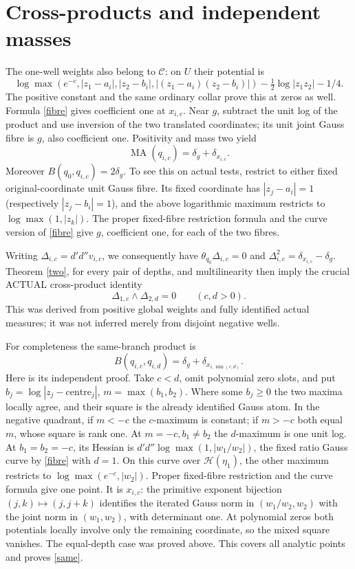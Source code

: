 \documentclass[11pt]{article}
\newcommand{\DD}{d'd''}
\newcommand{\MA}{\operatorname{MA}}
\newcommand{\C}{\mathcal C}
\begin{document}
\section*{Cross-products and independent masses}
The one-well weights also belong to $\C$: on $U$ their potential is
\[
 \log\max(e^{-c},|z_1-a_i|,|z_2-b_i|,
                 |(z_1-a_i)(z_2-b_i)|)
 -\tfrac12\log|z_1z_2|-1/4.
\]
The positive constant and the same ordinary collar prove this at zeros
as well. Formula \eqref{fibre} gives coefficient one at $x_{i,c}$.
Near $g$, subtract the unit log of the product and use inversion of
the two translated coordinates; its unit joint Gauss fibre is $g$,
also coefficient one. Positivity and mass two yield
\[
 \MA(q_{i,c})=\delta_g+\delta_{x_{i,c}}.
\]
Moreover $B(q_0,q_{i,c})=2\delta_g$. To see this on actual tests, restrict
to either fixed original-coordinate unit Gauss fibre. Its fixed coordinate
has $|z_j-a_i|=1$ (respectively $|z_j-b_i|=1$), and the above logarithmic
maximum restricts to $\log\max(1,|z_k|)$. The proper fixed-fibre
restriction formula and the curve version of \eqref{fibre} give $g$,
coefficient one, for each of the two fibres.

Writing $\Delta_{i,c}=\DD v_{i,c}$, we consequently have
$\theta_{q_0}\Delta_{i,c}=0$ and
$\Delta_{i,c}^2=\delta_{x_{i,c}}-\delta_g$. Theorem \ref{two},
for every pair of depths, and multilinearity then imply the crucial
ACTUAL cross-product identity
\begin{equation}\label{cross}
 \Delta_{1,c}\wedge\Delta_{2,d}=0\qquad(c,d>0).
\end{equation}
This was derived from positive global weights and fully identified actual
measures; it was not inferred merely from disjoint negative wells.

For completeness the same-branch product is
\begin{equation}\label{same}
 B(q_{i,c},q_{i,d})=\delta_g+\delta_{x_{i,\min(c,d)}}.
\end{equation}
Here is its independent proof. Take $c<d$, omit polynomial zero slots,
and put $b_j=\log|z_j-\text{centre}_j|$, $m=\max(b_1,b_2)$.
Where some $b_j\ge0$ the two maxima locally agree, and their square is
the already identified Gauss atom. In the negative quadrant, if $m<-c$
the $c$-maximum is constant; if $m>-c$ both equal $m$, whose square
is rank one. At $m=-c,b_1\ne b_2$ the $d$-maximum is one unit log.
At $b_1=b_2=-c$, its Hessian is
$\DD\log\max(1,|w_1/w_2|)$, the fixed ratio Gauss curve by
\eqref{fibre} with $d=1$. On this curve over $\mathscr H(\eta_1)$,
the other maximum restricts to $\log\max(e^{-c},|w_2|)$.
Proper fixed-fibre restriction and the curve formula give one point.
It is $x_{i,c}$: the primitive exponent bijection
$(j,k)\mapsto(j,j+k)$ identifies the iterated Gauss norm in
$(w_1/w_2,w_2)$ with the joint norm in $(w_1,w_2)$, with determinant one.
At polynomial zeros both potentials locally involve only the remaining
coordinate, so the mixed square vanishes. The equal-depth case was proved
above. This covers all analytic points and proves \eqref{same}.
\end{document}
